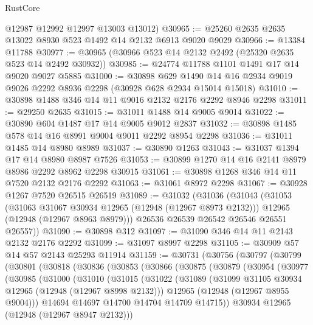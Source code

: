 \begin{lexlean}{RustCore}
\begin{coremodule}
      @12987
      @12992
      @12997
      @13003
      @13012)
@30965 := @25260 @2635 @2635 @13022 @8930 @523 @1492 @14 @2132 @6913 @9020 @9029
@30966 := @13384 @11788
@30977 := @30965 (@30966 @523 @14 @2132 @2492 (@25320 @2635 @523 @14 @2492 @30932))
@30985 := @24774 @11788 @1101 @1491 @17 @14 @9020 @9027 @5885
@31000 := @30898
    @629
    @1490
    @14
    @16
    @2934
    @9019
    @9026
    @2292
    @8936
    @2298
    (@30928 @628 @2934 @15014 @15018)
@31010 := @30898 @1488 @346 @14 @11 @9016 @2132 @2176 @2292 @8946 @2298
@31011 := @29250 @2635
@31015 := @31011 @1488 @14 @9005 @9014
@31022 := @30890 @604 @1487 @17 @14 @9005 @9012 @2837
@31032 := @30898 @1485 @578 @14 @16 @8991 @9004 @9011 @2292 @8954 @2298
@31036 := @31011 @1485 @14 @8980 @8989
@31037 := @30890 @1263
@31043 := @31037 @1394 @17 @14 @8980 @8987 @7526
@31053 := @30899 @1270 @14 @16 @2141 @8979 @8986 @2292 @8962 @2298 @30915
@31061 := @30898 @1268 @346 @14 @11 @7520 @2132 @2176 @2292
@31063 := @31061 @8972 @2298
@31067 := @30928 @1267 @7520 @26515 @26519
@31089 := @31032
    (@31036
      (@31043
        (@31053
          (@31063 @31067 @30934 @12965 (@12948 (@12967 @8973 @2132)))
          @12965
          (@12948 (@12967 @8963 @8979)))
        @26536
        @26539
        @26542
        @26546
        @26551
        @26557))
@31090 := @30898 @312
@31097 := @31090 @346 @14 @11 @2143 @2132 @2176 @2292
@31099 := @31097 @8997 @2298
@31105 := @30909 @57 @14 @57 @2143 @25293 @11914
@31159 := @30731
    (@30756
      (@30797
        (@30799
          (@30801
            (@30818
              (@30836
                (@30853
                  (@30866
                    (@30875
                      (@30879
                        (@30954
                          (@30977
                            (@30985
                              (@31000
                                (@31010
                                  (@31015
                                    (@31022
                                      (@31089
                                        (@31099 @31105 @30934 @12965 (@12948 (@12967 @8998 @2132)))
                                        @12965
                                        (@12948 (@12967 @8955 @9004)))
                                      @14694
                                      @14697
                                      @14700
                                      @14704
                                      @14709
                                      @14715))
                                  @30934
                                  @12965
                                  (@12948 (@12967 @8947 @2132)))

\end{coremodule}
\end{lexlean}
